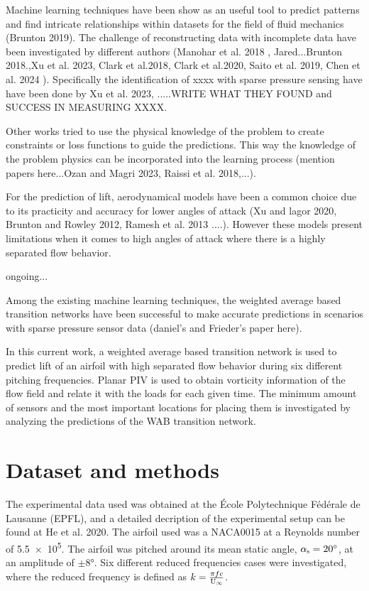 \documentclass[%
 reprint,
 amsmath,amssymb,
 aps,
]{revtex4-2}
\newcommand{\kindex}[2]{\ensuremath{{#1}_{\scalebox{0.65}{#2}}}}
\newcommand{\U}{\textrm{U}}
\newcommand{\Uinf}{\kindex{\U}{$\infty$}\xspace}
\begin{document}
Machine learning techniques have been show as an useful tool to predict patterns and find intricate relationships within datasets for the field of fluid mechanics (Brunton 2019). 
The challenge of reconstructing data with incomplete data have been investigated by different authors (Manohar et al. 2018 , Jared...Brunton 2018.,Xu et al. 2023,  Clark et al.2018, Clark et al.2020, Saito et al. 2019, Chen et al. 2024 ). Specifically the identification of xxxx with sparse pressure sensing have have been done by Xu et al. 2023, .....WRITE WHAT THEY FOUND and SUCCESS IN MEASURING XXXX.

Other works tried to use the physical knowledge of the problem to create constraints or loss functions to guide the predictions.
This way the knowledge of the problem physics can be incorporated into the learning process (mention papers here...Ozan and Magri 2023, Raissi et al. 2018,...).

For the prediction of lift, aerodynamical models have been a common choice due to its practicity and accuracy for lower angles of attack (Xu and lagor 2020, Brunton and Rowley 2012, Ramesh et al. 2013 ....). 
However these models present limitations when it comes to high angles of attack where there is a highly separated flow behavior.

ongoing...




Among the existing machine learning techniques, the weighted average based transition networks have been successful to make accurate predictions in scenarios with sparse pressure sensor data (daniel's and Frieder's paper here). 

In this current work, a weighted average based transition network is used to predict lift of an airfoil with high separated flow behavior during six different pitching frequencies.
Planar PIV is used to obtain vorticity information of the flow field and relate it with the loads for each given time. 
The minimum amount of sensors and the most important locations for placing them is investigated by analyzing the predictions of the WAB transition network. 





\section{Dataset and methods}

The experimental data used was obtained at the École Polytechnique Fédérale de Lausanne (EPFL), and a detailed decription of the experimental setup can be found at He et al. 2020. 
The airfoil used was a NACA0015 at a Reynolds number of \num{5.5e5}.
The airfoil was pitched around its mean static angle, $\kindex{\alpha}{s} = \ang{20}$, at an amplitude of $\pm \ang{8}$. 
Six different reduced frequencies cases were investigated, where the reduced frequency is defined as $k = \frac{\pi f c}{\Uinf}$.
\end{document}
